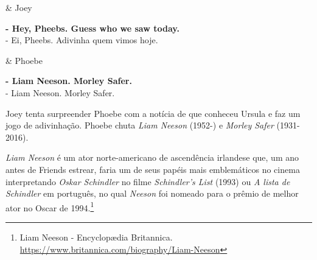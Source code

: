 \begin{tcolorbox}[enhanced,center upper,
    drop fuzzy shadow southeast, boxrule=0.3pt,
    lower separated=false, breakable,
    colframe=black!30!dialogoBorder,colback=white]
\begin{minipage}[c]{0.16\linewidth}
   & \centering \scriptsize{Joey}
\end{minipage}
\hfill
\begin{minipage}[c]{0.8\linewidth}
  \textbf{- Hey, Pheebs. Guess who we saw today.}\\
  - Ei, Pheebs. Adivinha quem vimos hoje.
\end{minipage}

\medskip
\begin{minipage}[c]{0.16\linewidth}
   & \centering \scriptsize{Phoebe}
\end{minipage}
\hfill
\begin{minipage}[c]{0.8\linewidth}
  \textbf{- Liam Neeson. Morley Safer.}\\
  - Liam Neeson. Morley Safer.
\end{minipage}
\end{tcolorbox}

Joey tenta surpreender Phoebe com a notícia de que conheceu Ursula e faz
um jogo de adivinhação. Phoebe chuta \emph{Liam Neeson} (1952-) e
\emph{Morley Safer} (1931-2016).

\emph{Liam Neeson} é um ator norte-americano de ascendência irlandese
que, um ano antes de Friends estrear, faria um de seus papéis mais
emblemáticos no cinema interpretando \emph{Oskar Schindler} no filme
\emph{Schindler's List} (1993) ou \emph{A lista de Schindler} em
português, no qual \emph{Neeson} foi nomeado para o prêmio de melhor
ator no Oscar de 1994.\footnote{\sloppy Liam Neeson - Encyclopædia Britannica. \url{https://www.britannica.com/biography/Liam-Neeson}}

